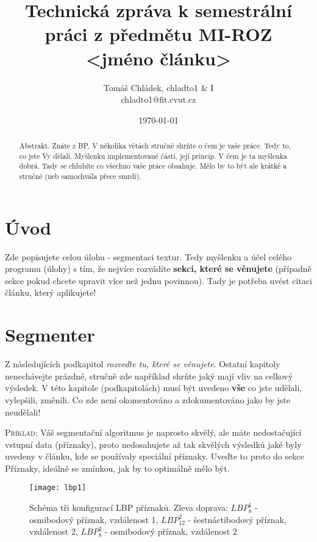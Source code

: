 \documentclass[a4paper,10pt,twocolumn]{article}
\title{Technická zpráva k semestrální práci z předmětu MI-ROZ \\ <jméno článku>}
\date{\today}
\author{Tomáš Chládek, chladto1 \& I \\ chladto1@fit.cvut.cz}
\begin{document}
\maketitle
\begin{abstract}
Abstrakt. Znáte z BP. V několika větách stručně shrňte o čem je vaše práce. Tedy to, co jste Vy dělali. Myšlenku implementované části, její princip. V čem je ta myšlenka dobrá. Tady se chlubíte co všechno vaše práce obsahuje. Mělo by to být ale krátké a stručné (neb samochvála přece smrdí). 
\end{abstract}

%
\section{Úvod}

Zde popisujete celou úlohu - segmentaci textur. Tedy myšlenku a účel celého programu (úlohy) s tím, že nejvíce rozvádíte \textbf {sekci, které se věnujete} (případně sekce pokud chcete upravit více než jednu povinnou). Tady je potřeba uvést citaci článku\cite{Zhenhua_LBP_2010}, který aplikujete!
%



%
\section{Segmenter}

Z následujících podkapitol \emph{rozveďte tu, které se věnujete}. Ostatní kapitoly nenechávejte prázdné, stručně zde například shrňte jaký mají vliv na celkový výsledek. V této kapitole (podkapitolách) musí být uvedeno \textbf{vše} co jste udělali, vylepšili, změnili. Co zde není okomentováno a zdokumentováno jako by jste neudělali!

\textsc {Příklad:}  Váš segmentační algoritmus je naprosto skvělý, ale máte nedostačující vstupní data (příznaky), proto nedosahujete až tak skvělých výsledků jaké byly uvedeny v článku, kde se používaly speciální příznaky. Uveďte to proto do sekce Příznaky, ideálně se zmínkou, jak by to optimálně mělo být. 

\begin{figure}[H]
       \begin{center}
              \texttt{[image: lbp1]}
       \end{center}
       \caption{Schéma tři konfigurací LBP příznaků. Zleva doprava: $LBP_8^1$ - osmibodový příznak, vzdálenost 1, $LBP_12^2$ - šestnáctibodový příznak, vzdálenost 2, $LBP_8^2$ - osmibodový příznak, vzdálenost 2}
       \label{fig3}
\end{figure}
\end{document}
